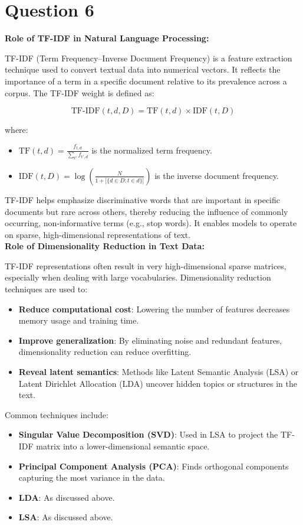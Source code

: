 \documentclass[a4paper,12pt]{article}
\begin{document}
\section*{Question 6}
\textbf{Role of TF-IDF in Natural Language Processing:}

TF-IDF (Term Frequency–Inverse Document Frequency) is a feature extraction technique used to convert textual data into numerical vectors. It reflects the importance of a term in a specific document relative to its prevalence across a corpus. The TF-IDF weight is defined as:

\[
\text{TF-IDF}(t, d, D) = \text{TF}(t, d) \times \text{IDF}(t, D)
\]

where:
\begin{itemize}
    \item \( \text{TF}(t, d) = \frac{f_{t,d}}{\sum_{t'} f_{t',d}} \) is the normalized term frequency.
    \item \( \text{IDF}(t, D) = \log\left( \frac{N}{1 + |\{d \in D : t \in d\}|} \right) \) is the inverse document frequency.
\end{itemize}

TF-IDF helps emphasize discriminative words that are important in specific documents but rare across others, thereby reducing the influence of commonly occurring, non-informative terms (e.g., stop words). It enables models to operate on sparse, high-dimensional representations of text. \\ 

\noindent\textbf{Role of Dimensionality Reduction in Text Data:}

TF-IDF representations often result in very high-dimensional sparse matrices, especially when dealing with large vocabularies. Dimensionality reduction techniques are used to:

\begin{itemize}
    \item \textbf{Reduce computational cost}: Lowering the number of features decreases memory usage and training time.
    \item \textbf{Improve generalization}: By eliminating noise and redundant features, dimensionality reduction can reduce overfitting.
    \item \textbf{Reveal latent semantics}: Methods like Latent Semantic Analysis (LSA) or Latent Dirichlet Allocation (LDA) uncover hidden topics or structures in the text.
\end{itemize}

Common techniques include:
\begin{itemize}
    \item \textbf{Singular Value Decomposition (SVD)}: Used in LSA to project the TF-IDF matrix into a lower-dimensional semantic space.
    \item \textbf{Principal Component Analysis (PCA)}: Finds orthogonal components capturing the most variance in the data.
    \item \textbf{LDA}: As discussed above.
    \item \textbf{LSA}: As discussed above.
\end{itemize}
\end{document}
